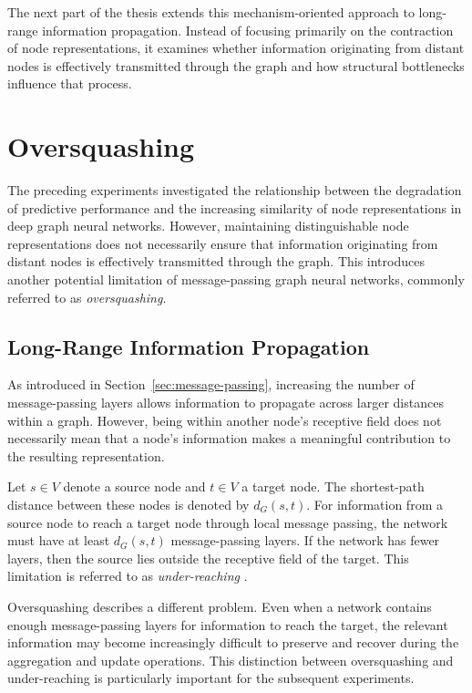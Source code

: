 \documentclass[english]{lni}
\begin{document}
The next part of the thesis extends this mechanism-oriented approach to long-range information propagation. Instead of focusing primarily on the contraction of node representations, it examines whether information originating from distant nodes is effectively transmitted through the graph and how structural bottlenecks influence that process.



\section{Oversquashing}
\label{sec:oversquashing}

The preceding experiments investigated the relationship between the degradation of predictive performance and the increasing
similarity of node representations in deep graph neural networks. However, maintaining distinguishable node representations does
not necessarily ensure that information originating from distant nodes is effectively transmitted through the graph. This introduces
another potential limitation of message-passing graph neural networks, commonly referred to as \emph{oversquashing}.

\subsection{Long-Range Information Propagation}
\label{sec:longrange-propagation}

As introduced in Section~\ref{sec:message-passing}, increasing the number of message-passing layers allows information to propagate
across larger distances within a graph. However, being within another node's receptive field does not necessarily mean that a node's information makes a meaningful contribution to the resulting representation.

Let $s\in V$ denote a source node and $t\in V$ a target node. The shortest-path distance between these nodes is denoted by $d_G(s,t)$. For information from a source node to reach a target node through local message passing, the network must have at least $d_G(s,t)$ message-passing layers. If the network has fewer layers, then the source lies outside the receptive field of the target. This limitation is referred to as \emph{under-reaching} \cite{alon2021bottleneck}.

Oversquashing describes a different problem. Even when a network contains enough message-passing layers for information to reach
the target, the relevant information may become increasingly difficult to preserve and recover during the aggregation and update operations. This distinction between oversquashing and under-reaching is particularly important for the subsequent experiments.
\end{document}
